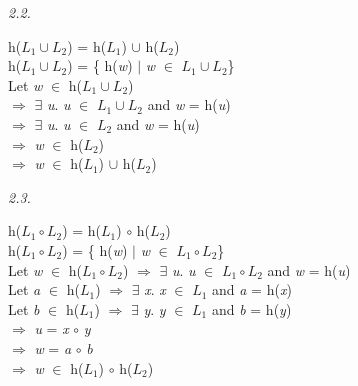 \documentclass[12pt]{report}
\begin{document}
\textit{2.2.}
\begin{flushleft}
h($L_1 \cup L_2$) = h($L_1$) $\cup$ h($L_2$)\\
h($L_1 \cup L_2$) = \{ h(\textit{w}) $\vert$ \textit{w} $\in$ $L_1 \cup L_2$\}\\
Let \textit{w} $\in$ h($L_1 \cup L_2$) \\
\tab $\Rightarrow$ $\exists$ \textit{u}. \textit{u} $\in$ $L_1 \cup L_2$ and \textit{w} = h(\textit{u})\\
\tab $\Rightarrow$ $\exists$ \textit{u}. \textit{u} $\in$ $L_2$ and \textit{w} = h(\textit{u})\\
\tab $\Rightarrow$ \textit{w} $\in$ h($L_2$)\\
\tab $\Rightarrow$ \textit{w} $\in$ h($L_1$)  $\cup$ h($L_2$)\\
\end{flushleft}


\textit{2.3.}
\begin{flushleft}
h($L_1 \circ L_2$) = h($L_1$) $\circ$ h($L_2$)\\
h($L_1 \circ L_2$) = \{ h(\textit{w}) $\vert$ \textit{w} $\in$ $L_1 \circ L_2$\}\\
Let \textit{w} $\in$ h($L_1 \circ L_2$) 
 $\Rightarrow$ $\exists$ \textit{u}. \textit{u} $\in$ $L_1 \circ L_2$ and \textit{w} = h(\textit{u})\\
Let \textit{a} $\in$ h($L_1$) 
 $\Rightarrow$ $\exists$ \textit{x}. \textit{x} $\in$ $L_1$ and \textit{a} = h(\textit{x})\\
Let \textit{b} $\in$ h($L_1$) 
 $\Rightarrow$ $\exists$ \textit{y}. \textit{y} $\in$ $L_1$ and \textit{b} = h(\textit{y})\\
\tab $\Rightarrow$ \textit{u} = \textit{x} $\circ$ \textit{y}\\
\tab $\Rightarrow$ \textit{w} = \textit{a} $\circ$ \textit{b}\\
\tab $\Rightarrow$ \textit{w} $\in$ h($L_1$) $\circ$ h($L_2$)\\


\end{flushleft}
\end{document}
